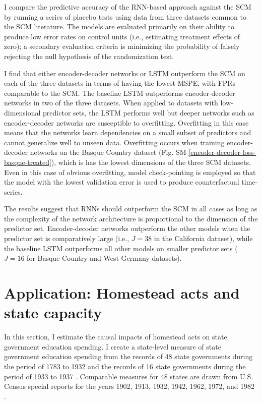 \documentclass[hidelinks,12pt]{article}
\begin{document}
I compare the predictive accuracy of the RNN-based approach against the SCM by running a series of placebo tests using data from three datasets common to the SCM literature. The models are evaluated primarily on their ability to produce low error rates on control units (i.e., estimating treatment effects of zero); a secondary evaluation criteria is minimizing the probability of falsely rejecting the null hypothesis of the randomization test. 

I find that either encoder-decoder networks or LSTM outperform the SCM on each of the three datasets in terms of having the lowest MSPE, with FPRs comparable to the SCM. The baseline LSTM outperforms encoder-decoder networks in two of the three datasets. When applied to datasets with low-dimensional predictor sets, the LSTM performs well but deeper networks such as encoder-decoder networks are susceptible to overfitting. Overfitting in this case means that the networks learn dependencies on a small subset of predictors and cannot generalize well to unseen data. Overfitting occurs when training encoder-decoder networks on the Basque Country dataset (Fig. SM-\ref{encoder-decoder-loss-basque-treated}), which is has the lowest dimensions of the three SCM datasets. Even in this case of obvious overfitting, model check-pointing is employed so that the model with the lowest validation error is used to produce counterfactual time-series.

The results suggest that RNNs should outperform the SCM in all cases as long as the complexity of the network architecture is proportional to the dimension of the predictor set. Encoder-decoder networks outperform the other models when the predictor set is comparatively large (i.e., $J=38$ in the California dataset), while the baseline LSTM outperforms all other models on smaller predictor sets ($J=16$ for Basque Country and West Germany datasets). 

\section{Application: Homestead acts and state capacity} \label{state-capacity}

In this section, I estimate the causal impacts of homestead acts on state government education spending. I create a state-level measure of state government education spending from the records of 48 state governments during the period of 1783 to 1932 \citep{sylla1993sources} and the records of 16 state governments during the period of 1933 to 1937 \citep{sylla1995sourcesa,sylla1995sourcesb}. Comparable measures for 48 states are drawn from U.S. Census special reports for the years 1902, 1913, 1932, 1942, 1962, 1972, and 1982 \citep{haines2010}.
\end{document}
